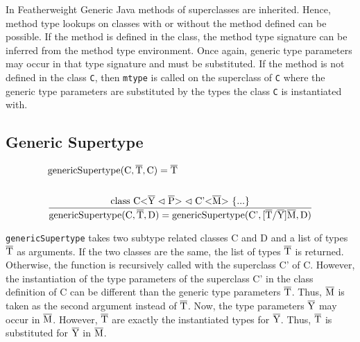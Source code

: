 In Featherweight Generic Java methods of superclasses are inherited. Hence, method type lookups on classes with or without the method defined can be possible. If the method is defined in the class, the method type signature can be inferred from the method type environment. Once again, generic type parameters may occur in that type signature and must be substituted.
If the method is not defined in the class \verb|C|, then \verb|mtype| is called on the superclass of \verb|C| where the generic type parameters are substituted by the types the class \verb|C| is instantiated with.

\subsection{Generic Supertype}

\begin{align*}
    &\text{genericSupertype} (\text{C}, \overline{\text{T}}, \text{C} ) = \overline{\text{T}}\\
    \\
    &\frac{ \text{class} \ \text{C} \text{<} \overline{\text{Y}} \vartriangleleft \overline{\text{P}} \text{>} \vartriangleleft \text{C'<}\overline{\text{M}}\text{>} \ \{ ... \} }{ \text{genericSupertype} ( \text{C}, \overline{\text{T}}, \text{D} ) = \text{genericSupertype} ( \text{C'}, \text{[}\overline{\text{T}}/\overline{\text{Y}}\text{]}\overline{\text{M}}, \text{D} ) }\\
\end{align*}

\verb|genericSupertype| takes two subtype related classes C and D and a list of types $\overline{\text{T}}$ as arguments. If the two classes are the same, the list of types $\overline{\text{T}}$ is returned. Otherwise, the function is recursively called with the superclass C' of C.
However, the instantiation of the type parameters of the superclass C' in the class definition of C can be different than the generic type parameters $\overline{\text{T}}$. Thus, $\overline{\text{M}}$ is taken as the second argument instead of $\overline{\text{T}}$. Now, the type parameters $\overline{\text{Y}}$ may occur in $\overline{\text{M}}$. However, $\overline{\text{T}}$ are exactly the instantiated types for $\overline{\text{Y}}$. Thus, $\overline{\text{T}}$ is substituted for $\overline{\text{Y}}$ in $\overline{\text{M}}$.
